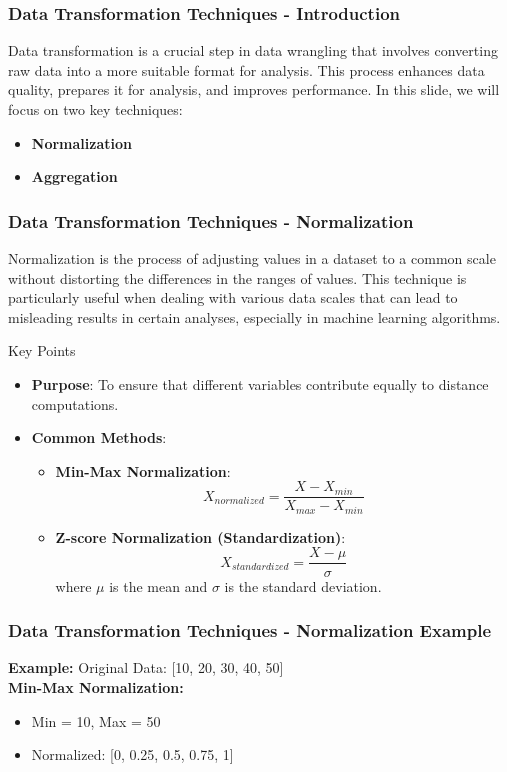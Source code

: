 \documentclass[aspectratio=169]{beamer}
\begin{document}
\begin{frame}[fragile]
    \frametitle{Data Transformation Techniques - Introduction}
    Data transformation is a crucial step in data wrangling that involves converting raw data into a more suitable format for analysis. This process enhances data quality, prepares it for analysis, and improves performance. In this slide, we will focus on two key techniques: 
    \begin{itemize}
        \item \textbf{Normalization}
        \item \textbf{Aggregation}
    \end{itemize}
\end{frame}

\begin{frame}[fragile]
    \frametitle{Data Transformation Techniques - Normalization}
    Normalization is the process of adjusting values in a dataset to a common scale without distorting the differences in the ranges of values. This technique is particularly useful when dealing with various data scales that can lead to misleading results in certain analyses, especially in machine learning algorithms.
    
    \begin{block}{Key Points}
        \begin{itemize}
            \item \textbf{Purpose}: To ensure that different variables contribute equally to distance computations.
            \item \textbf{Common Methods}:
                \begin{itemize}
                    \item \textbf{Min-Max Normalization}:
                    \[
                    X_{normalized} = \frac{X - X_{min}}{X_{max} - X_{min}}
                    \]
                    \item \textbf{Z-score Normalization (Standardization)}:
                    \[
                    X_{standardized} = \frac{X - \mu}{\sigma}
                    \]
                    where $\mu$ is the mean and $\sigma$ is the standard deviation.
                \end{itemize}
        \end{itemize}
    \end{block}
\end{frame}

\begin{frame}[fragile]
    \frametitle{Data Transformation Techniques - Normalization Example}
    \textbf{Example:} Original Data: [10, 20, 30, 40, 50] \\
    \textbf{Min-Max Normalization:}
    \begin{itemize}
        \item Min = 10, Max = 50
        \item Normalized: [0, 0.25, 0.5, 0.75, 1]
    \end{itemize}
\end{frame}
\end{document}
